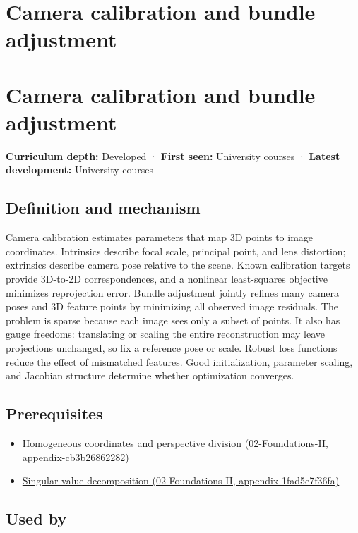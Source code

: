 \hypertarget{appendix-3ee9861904d5}{}
\section*{Camera calibration and bundle adjustment}
\section{Camera calibration and bundle adjustment}\label{camera-calibration-and-bundle-adjustment}

\textbf{Curriculum depth:} Developed · \textbf{First seen:} University courses · \textbf{Latest development:} University courses

\subsection{Definition and mechanism}\label{definition-and-mechanism}

Camera calibration estimates parameters that map 3D points to image coordinates. Intrinsics describe focal scale, principal point, and lens distortion; extrinsics describe camera pose relative to the scene. Known calibration targets provide 3D-to-2D correspondences, and a nonlinear least-squares objective minimizes reprojection error. Bundle adjustment jointly refines many camera poses and 3D feature points by minimizing all observed image residuals. The problem is sparse because each image sees only a subset of points. It also has gauge freedoms: translating or scaling the entire reconstruction may leave projections unchanged, so fix a reference pose or scale. Robust loss functions reduce the effect of mismatched features. Good initialization, parameter scaling, and Jacobian structure determine whether optimization converges.

\subsection{Prerequisites}\label{prerequisites}

\begin{itemize}
\tightlist
\item
  \href{}{Homogeneous coordinates and perspective division (02-Foundations-II, appendix-cb3b26862282)}
\item
  \href{}{Singular value decomposition (02-Foundations-II, appendix-1fad5e7f36fa)}
\end{itemize}

\subsection{Used by}\label{used-by}

